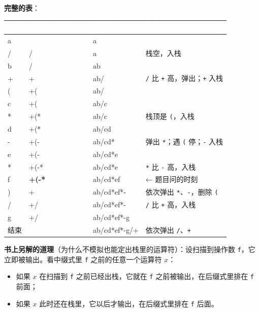 \documentclass[10.5pt,a4paper,oneside]{article}
\newcommand{\hlred}[1]{\textcolor{wdred}{\bfseries #1}}
\providecommand{\tightlist}{\setlength{\itemsep}{2pt}\setlength{\parskip}{0pt}}
\begin{document}
\begin{addbox}

\textbf{完整的表}：

{
\begin{xltabular}{\linewidth}{>{\hsize\raggedright\arraybackslash}X>{\hsize\raggedright\arraybackslash}X>{\hsize\raggedright\arraybackslash}X>{\hsize\raggedright\arraybackslash}X}
\textcolor{white}{\bfseries 扫描} & \textcolor{white}{\bfseries 栈（左边是栈底）} & \textcolor{white}{\bfseries 后缀表达式} & \textcolor{white}{\bfseries 动作} \\
\endfirsthead
a &  & a &  \\ \hline
/ & / & a & 栈空，入栈 \\ \hline
b & / & ab &  \\ \hline
+ & + & ab/ & \texttt{/} 比 \texttt{+} 高，弹出；\texttt{+} 入栈 \\ \hline
( & +( & ab/ &  \\ \hline
c & +( & ab/c &  \\ \hline
* & +(* & ab/c & 栈顶是 \texttt{(}，入栈 \\ \hline
d & +(* & ab/cd &  \\ \hline
- & +(- & ab/cd* & 弹出 \texttt{*}；遇 \texttt{(} 停；\texttt{-} 入栈 \\ \hline
e & +(- & ab/cd*e &  \\ \hline
* & +(-* & ab/cd*e & \texttt{*} 比 \texttt{-} 高，入栈 \\ \hline
f & \textbf{\hlred{+(-*}} & ab/cd*ef & ← 题目问的时刻 \\ \hline
) & + & ab/cd*ef*- & 依次弹出 \texttt{*}、\texttt{-}，删除 \texttt{(} \\ \hline
/ & +/ & ab/cd*ef*- & \texttt{/} 比 \texttt{+} 高，入栈 \\ \hline
g & +/ & ab/cd*ef*-g &  \\ \hline
结束 &  & ab/cd*ef*-g/+ & 依次弹出 \texttt{/}、\texttt{+} \\ \hline
\end{xltabular}\par\vspace{4pt}}

\textbf{书上另解的道理}（为什么不模拟也能定出栈里的运算符）：设扫描到操作数
\texttt{f}，它立即被输出。看中缀式里 \texttt{f} 之前的任意一个运算符
\(x\)：

\begin{itemize}
\tightlist
\item
  如果 \(x\) 在扫描到 \texttt{f} 之前已经出栈，它就在 \texttt{f}
  之前被输出，在后缀式里排在 \texttt{f} 前面；
\item
  如果 \(x\) 此时还在栈里，它以后才输出，在后缀式里排在 \texttt{f}
  后面。
\end{itemize}


\end{addbox}
\end{document}
